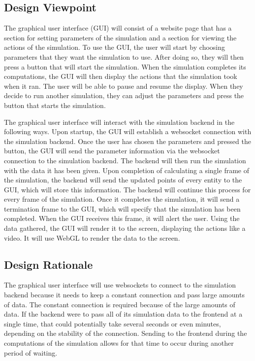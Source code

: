 \documentclass[onecolumn, draftclsnofoot,10pt, compsoc]{IEEEtran}
\begin{document}
\subsection{Design Viewpoint}
The graphical user interface (GUI) will consist of a website page that has a section for setting parameters of the simulation and a section for viewing the actions of the simulation.
To use the GUI, the user will start by choosing parameters that they want the simulation to use.
After doing so, they will then press a button that will start the simulation.
When the simulation completes its computations, the GUI will then display the actions that the simulation took when it ran.
The user will be able to pause and resume the display.
When they decide to run another simulation, they can adjust the parameters and press the button that starts the simulation.

The graphical user interface will interact with the simulation backend in the following ways.
Upon startup, the GUI will establish a websocket connection with the simulation backend.
Once the user has chosen the parameters and pressed the button, the GUI will send the parameter information via the websocket connection to the simulation backend.
The backend will then run the simulation with the data it has been given.
Upon completion of calculating a single frame of the simulation, the backend will send the updated points of every entity to the GUI, which will store this information.
The backend will continue this process for every frame of the simulation.
Once it completes the simulation, it will send a termination frame to the GUI, which will specify that the simulation has been completed.
When the GUI receives this frame, it will alert the user.
Using the data gathered, the GUI will render it to the screen, displaying the actions like a video.
It will use WebGL to render the data to the screen.
\subsection{Design Rationale}
The graphical user interface will use websockets to connect to the simulation backend because it needs to keep a constant connection and pass large amounts of data.
The constant connection is required because of the large amounts of data.
If the backend were to pass all of its simulation data to the frontend at a single time, that could potentially take several seconds or even minutes, depending on the stability of the connection.
Sending to the frontend during the computations of the simulation allows for that time to occur during another period of waiting.
\end{document}
